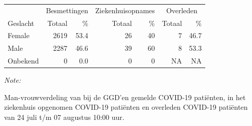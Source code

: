 \documentclass[
  english,
  man,floatsintext]{apa6}
\begin{document}
\begin{table}[H]
\centering\begingroup\fontsize{11}{13}\selectfont

\begin{threeparttable}
\begin{tabular}{lrrrrrr}
\toprule
\multicolumn{1}{c}{ } & \multicolumn{2}{c}{Besmettingen} & \multicolumn{2}{c}{Ziekenhuisopnames} & \multicolumn{2}{c}{Overleden} \\
\cmidrule(l{3pt}r{3pt}){2-3} \cmidrule(l{3pt}r{3pt}){4-5} \cmidrule(l{3pt}r{3pt}){6-7}
Geslacht & Totaal & \% & Totaal & \% & Totaal & \%\\
\midrule
Female & 2619 & 53.4 & 26 & 40 & 7 & 46.7\\
Male & 2287 & 46.6 & 39 & 60 & 8 & 53.3\\
Onbekend & 0 & 0.0 & 0 & 0 & NA & NA\\
\bottomrule
\end{tabular}
\begin{tablenotes}
\item \textit{Note: } 
\item Man-vrouwverdeling van bij de GGD’en gemelde COVID-19 patiënten, in het ziekenhuis opgenomen COVID-19 patiënten en overleden COVID-19 patiënten van 24 juli t/m 07 augustus 10:00 uur.
\end{tablenotes}
\end{threeparttable}
\endgroup{}
\end{table}
\newpage
\end{document}
